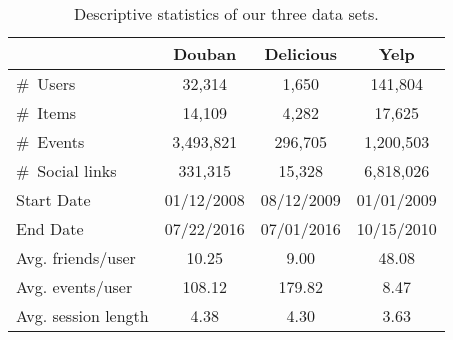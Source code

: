 \documentclass[sigconf]{acmart}
\begin{document}
\begin{table}
\centering
\begin{tabular}{lccc} 
\toprule & Douban & Delicious & Yelp \\
\midrule \#\ Users & 32,314 & 1,650 & 141,804 \\
\#\ Items & 14,109 & 4,282 & 17,625 \\
\#\ Events & 3,493,821 & 296,705 & 1,200,503 \\
\#\ Social links & 331,315 & 15,328 & 6,818,026 \\
Start Date & 01/12/2008 & 08/12/2009 & 01/01/2009\\
End Date & 07/22/2016 & 07/01/2016 & 10/15/2010 \\
\midrule Avg. friends/user & 10.25 & 9.00 & 48.08 \\
Avg. events/user & 108.12 & 179.82 & 8.47 \\
Avg. session length & 4.38 & 4.30 & 3.63 \\
\bottomrule \end{tabular}
\caption{Descriptive statistics of our three data sets.}
\vspace{-15pt}
\label{tab::stat}
\end{table}
\end{document}
